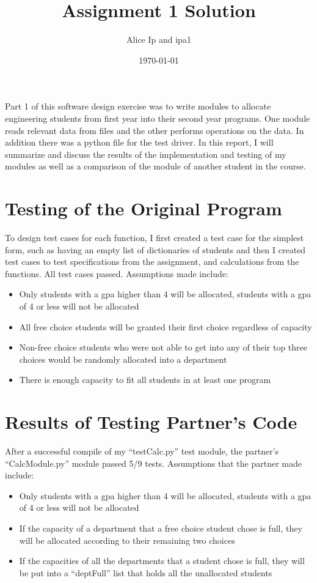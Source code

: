 \documentclass[12pt]{article}
\title{Assignment 1 Solution}
\author{Alice Ip and ipa1}
\date{\today}
\begin{document}
\maketitle

Part 1 of this software design exercise was to write modules to allocate engineering students from first year into their second year programs. One module reads relevant data from files and the other performs operations on the data. In addition there was a python file for the test driver. In this report, I will summarize and discuss the results of the implementation and testing of my modules as well as a comparison of the module of another student in the course.

\section{Testing of the Original Program}

To design test cases for each function, I first created a test case for the simplest form, such as having an empty list of dictionaries of students and then I created test cases to test specifications from the assignment, and calculations from the functions. All test cases passed. Assumptions made include:

\begin{itemize}
\item Only students with a gpa higher than 4 will be allocated, students with a gpa of 4 or less will not be allocated
\item All free choice students will be granted their first choice regardless of capacity
\item Non-free choice students who were not able to get into any of their top three choices would be randomly allocated into a department
\item There is enough capacity to fit all students in at least one program
\end{itemize}

\section{Results of Testing Partner's Code}

After a successful compile of my ``testCalc.py'' test module, the partner's ``CalcModule.py'' module passed 5/9 tests. Assumptions that the partner made include:

\begin{itemize}

\item Only students with a gpa higher than 4 will be allocated, students with a gpa of 4 or less will not be allocated
\item If the capacity of a department that a free choice student chose is full, they will be allocated according to their remaining two choices
\item If the capacities of all the departments that a student chose is full, they will be put into a ``deptFull'' list that holds all the unallocated students
\end{itemize}
\end{document}
